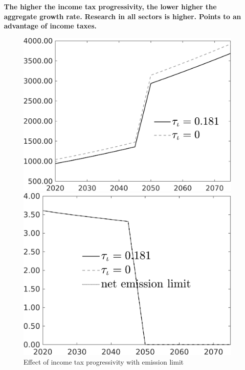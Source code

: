 \textbf{The higher the income tax progressivity, the lower higher the aggregate growth rate. Research in all sectors is higher. \ar Points to an advantage of income taxes.}
\begin{figure}[h!!]
	\centering
	\caption{Effect of income tax progressivity with emission limit }\label{fig:CompTaul_TAUF}
	\begin{minipage}[]{0.32\textwidth}
		\includegraphics[width=1\textwidth]{../../codding_model/own_basedOnFried/optimalPol_010922_revision/figures/all_13Sept22/TAUFCO2_LEVDifTAUL_regime0_spillover0_nsk0_xgr0_sep1_LFlimit1_emsbase0_countec0_GovRev1_etaa0.79_lgd1.png}
	\end{minipage}	
\begin{minipage}[]{0.32\textwidth}
\includegraphics[width=1\textwidth]{../../codding_model/own_basedOnFried/optimalPol_010922_revision/figures/all_13Sept22/CompTaul_Reg0_Emnet_spillover0_nsk0_xgr0_sep1_LFlimit1_emsbase0_countec0_GovRev1_etaa0.79_lgd1.png}

\end{minipage}
\end{figure}
